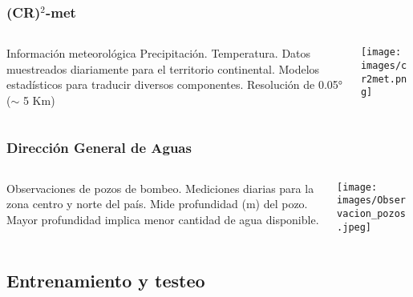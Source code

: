 \documentclass{beamer}
\begin{document}
  \begin{frame}
    \frametitle{(CR)$^2$-met}
    \begin{columns}
      \begin{column}{0.5\textwidth}
        \begin{outline}
          \1 Información meteorológica
            \2 Precipitación.
            \2 Temperatura.
          \1 Datos muestreados diariamente para el territorio continental.
          \1 Modelos estadísticos para traducir diversos componentes.  
          \1 Resolución de 0.05° ($\sim$ 5 Km)
        \end{outline}
      \end{column}

      \begin{column}{0.5\textwidth}
        \centering
        \texttt{[image: images/cr2met.png]}
      \end{column}
    \end{columns}

  \end{frame}

  \begin{frame}
    \frametitle{Dirección General de Aguas}

    \begin{columns}
    
      \begin{column}{0.5\textwidth}
        \begin{outline}
          \1 Observaciones de pozos de bombeo.
          \1 Mediciones diarias para la zona centro y norte del país.
          \1 Mide profundidad (m) del pozo.
            \2 Mayor profundidad implica menor cantidad de agua disponible.
        \end{outline}
      \end{column}

      \begin{column}{0.5\textwidth}
        \centering
        \texttt{[image: images/Observacion\_pozos.jpeg]}
      \end{column}

    \end{columns}
  \end{frame}


  \subsection*{Entrenamiento y testeo}
\end{document}
